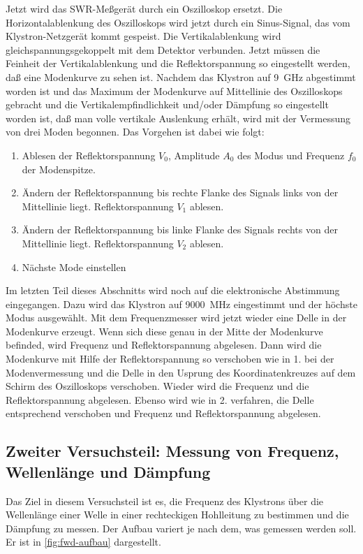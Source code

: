 Jetzt wird das SWR-Meßgerät durch ein Oszilloskop ersetzt.  Die
Horizontalablenkung des Oszilloskops wird jetzt durch ein Sinus-Signal,
das vom Klystron-Netzgerät kommt gespeist.  Die Vertikalablenkung wird
gleichspannungsgekoppelt mit dem Detektor verbunden.  Jetzt müssen die
Feinheit der Vertikalablenkung und die Reflektorspannung so eingestellt
werden, daß eine Modenkurve zu sehen ist.  Nachdem das Klystron auf
\SI{9}{GHz} abgestimmt worden ist und das Maximum der Modenkurve auf
Mittellinie des Oszilloskops gebracht und die Vertikalempfindlichkeit
und/oder Dämpfung so eingestellt worden ist, daß man volle vertikale
Auslenkung erhält, wird mit der Vermessung von drei Moden begonnen.  Das
Vorgehen ist dabei wie folgt:
%
\begin{enumerate}
\item Ablesen der Reflektorspannung $V_0$, Amplitude $A_0$ des Modus und
  Frequenz $f_0$ der Modenspitze.
\item Ändern der Reflektorspannung bis rechte Flanke des Signals links
  von der Mittellinie liegt.  Reflektorspannung $V_1$ ablesen.
\item Ändern der Reflektorspannung bis linke Flanke des Signals rechts
  von der Mittellinie liegt.  Reflektorspannung $V_2$ ablesen.
\item Nächste Mode einstellen
\end{enumerate}

Im letzten Teil dieses Abschnitts wird noch auf die elektronische
Abstimmung eingegangen.  Dazu wird das Klystron auf \SI{9000}{MHz}
eingestimmt und der höchste Modus ausgewählt.  Mit dem Frequenzmesser
wird jetzt wieder eine Delle in der Modenkurve erzeugt.  Wenn sich diese
genau in der Mitte der Modenkurve befinded, wird Frequenz und
Reflektorspannung abgelesen.  Dann wird die Modenkurve mit Hilfe der
Reflektorspannung so verschoben wie in 1. bei der Modenvermessung und
die Delle in den Usprung des Koordinatenkreuzes auf dem Schirm des
Oszilloskops verschoben.  Wieder wird die Frequenz und die
Reflektorspannung abgelesen.  Ebenso wird wie in 2. verfahren, die Delle
entsprechend verschoben und Frequenz und Reflektorspannung abgelesen.

\subsection{%
  Zweiter Versuchsteil: Messung von Frequenz, Wellenlänge und Dämpfung}

Das Ziel in diesem Versuchsteil ist es, die Frequenz des Klystrons über
die Wellenlänge einer Welle in einer rechteckigen Hohlleitung zu
bestimmen und die Dämpfung zu messen.  Der Aufbau variert je nach dem,
was gemessen werden soll.  Er ist in \cref{fig:fwd-aufbau} dargestellt.

